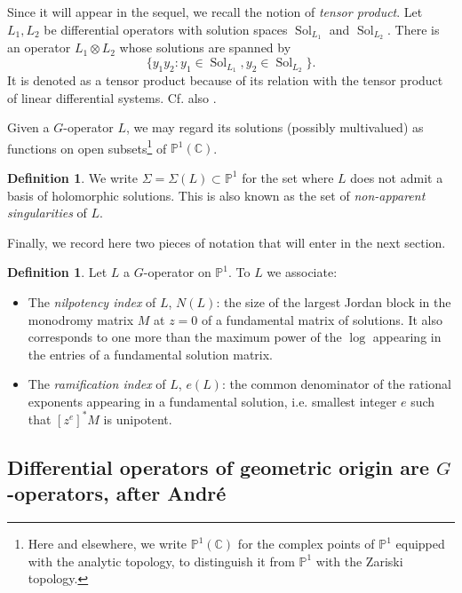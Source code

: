 \documentclass[10pt]{article}
\numberwithin{equation}{section}
\theoremstyle{plain}
\theoremstyle{definition}
\newtheorem{defn}[thm]{Definition}
\theoremstyle{remark}
\newcommand{\C}{\mathbb{C}}
\newcommand{\PP}{\mathbb{P}}
\begin{document}
Since it will appear in the sequel, we recall the notion of \emph{tensor product}. Let $L_1, L_2$ be differential operators with solution spaces $\operatorname{Sol}_{L_1}$ and $\operatorname{Sol}_{L_2}$. There is an operator $L_1\otimes L_2$ whose solutions are spanned by 
\begin{displaymath}
    \{y_1 y_2 : y_1\in \operatorname{Sol}_{L_1}, y_2\in \operatorname{Sol}_{L_2} \}.
\end{displaymath}
It is denoted as a tensor product because of its relation with the tensor product of linear differential systems. Cf. also \cite[Def. 2.20]{zbMATH01860838}.

Given a $G$-operator $L$, we may regard its solutions (possibly multivalued) as functions on open subsets\footnote{Here and elsewhere, we write $\PP^1(\C)$ for the complex points of $\PP^1$ equipped with the analytic topology, to distinguish it from $\PP^1$ with the Zariski topology.} of $\PP^1(\C)$. 
\begin{defn}
\label{sigmadef}
We write $\Sigma = \Sigma(L) \subset \mathbb{P}^1$ for the set where $L$ does not admit a basis of holomorphic solutions. This is also known as the set of \emph{non-apparent singularities} of $L$.
\end{defn}



Finally, we record here two pieces of notation that will enter in the next section.
\begin{defn}
\label{indexdef}
Let $L$ a $G$-operator on $\PP^1$. To $L$ we associate:
\begin{itemize}
    \item The \emph{nilpotency index} of $L$, $N(L)$: the size of the largest Jordan block in the monodromy matrix $M$ at $z = 0$ of a fundamental matrix of solutions. It also corresponds to one more than the maximum power of the $\log$ appearing in the entries of a fundamental solution matrix.
    \item The \emph{ramification index} of $L$, $e(L)$: the common denominator of the rational exponents appearing in a fundamental solution, i.e. smallest integer $e$ such that $[z^e]^*M$ is unipotent. 
\end{itemize}
\end{defn}

\subsection{Differential operators of geometric
origin are $G$-operators, after André}\label{thmGoperator}
\end{document}
